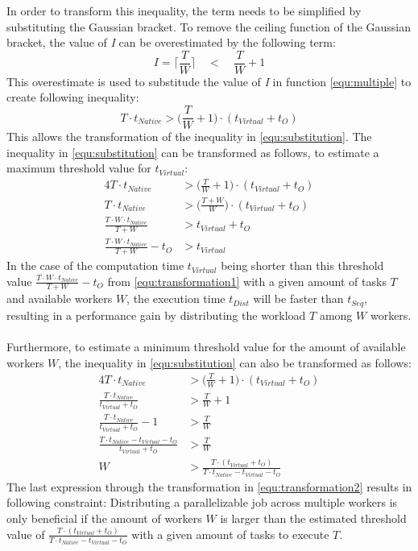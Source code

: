 In order to transform this inequality, the term needs to be simplified by substituting the Gaussian bracket. To remove the ceiling function of the Gaussian bracket, the value of \emph{I} can be overestimated by the following term:
\begin{equation}
  I = \bigg\lceil\frac{T}{W}\bigg\rceil \quad < \quad \frac{T}{W} + 1
  \label{equ:frac2}
\end{equation}
This overestimate is used to substitude the value of \emph{I} in function \eqref{equ:multiple} to create following inequality:
\begin{equation}
  T \cdot t_{Native} > \bigg(\frac{T}{W} + 1\bigg) \cdot (t_{Virtual} + t_{O})
  \label{equ:substitution}
\end{equation}
This allows the transformation of the inequality in \eqref{equ:substitution}. The inequality in \eqref{equ:substitution} can be transformed as follows, to estimate a maximum threshold value for $t_{Virtual}$:
\begin{alignat}{4}
  T \cdot t_{Native} &> \bigg(\frac{T}{W} + 1\bigg) \cdot (t_{Virtual} + t_{O}) \nonumber \\
  T \cdot t_{Native} &> \bigg(\frac{T + W}{W}\bigg) \cdot (t_{Virtual} + t_{O}) \nonumber \\
  \frac{T \cdot W \cdot t_{Native}}{T + W} &> t_{Virtual} + t_{O} \nonumber \\
  \frac{T \cdot W \cdot t_{Native}}{T + W} - t_{O} &> t_{Virtual}
  \label{equ:transformation1}
\end{alignat}
In the case of the computation time $t_{Virtual}$ being shorter than this threshold value $\frac{T \cdot W \cdot t_{Native}}{T + W} - t_{O}$ from \eqref{equ:transformation1} with a given amount of tasks $T$ and available workers $W$, the execution time $t_{Dist}$ will be faster than $t_{Seq}$, resulting in a performance gain by distributing the workload $T$ among $W$ workers.
~\\
Furthermore, to estimate a minimum threshold value for the amount of available workers $W$, the inequality in \eqref{equ:substitution} can also be transformed as follows:
\begin{alignat}{4}
  T \cdot t_{Native} &> \bigg(\frac{T}{W} + 1\bigg) \cdot (t_{Virtual} + t_{O}) \nonumber \\
  \frac{T \cdot t_{Native}}{t_{Virtual} + t_{O}} &> \frac{T}{W} + 1 \nonumber \\
  \frac{T \cdot t_{Native}}{t_{Virtual} + t_{O}} - 1 &> \frac{T}{W} \nonumber \\
  \frac{T \cdot t_{Native} - t_{Virtual} - t_{O}}{t_{Virtual} + t_{O}} &> \frac{T}{W} \nonumber \\
  W &> \frac{T \cdot (t_{Virtual} + t_{O})}{T \cdot t_{Native} - t_{Virtual} - t_{O}}
  \label{equ:transformation2}
\end{alignat}
The last expression through the transformation in \eqref{equ:transformation2} results in following constraint: Distributing a parallelizable job across multiple workers is only beneficial if the amount of workers $W$ is larger than the estimated threshold value of $\frac{T \cdot (t_{Virtual} + t_{O})}{T \cdot t_{Native} - t_{Virtual} - t_{O}}$ with a given amount of tasks to execute $T$.

